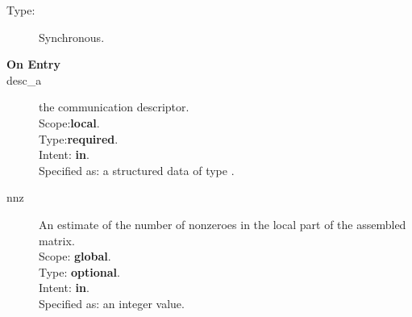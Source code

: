 



%
%






%
%


\begin{description}
\item[Type:] Synchronous.
\item[\bf On Entry]
\item[desc\_a] the communication descriptor.\\
Scope:{\bf local}.\\
Type:{\bf required}.\\
Intent: {\bf in}.\\
Specified as: a structured data of type \descdata.
\item[nnz] An estimate of the number of nonzeroes in the local
  part of the assembled matrix.\\ 
Scope: {\bf global}.\\
Type: {\bf optional}.\\
Intent: {\bf in}.\\
Specified as: an integer value. 
\end{description}

